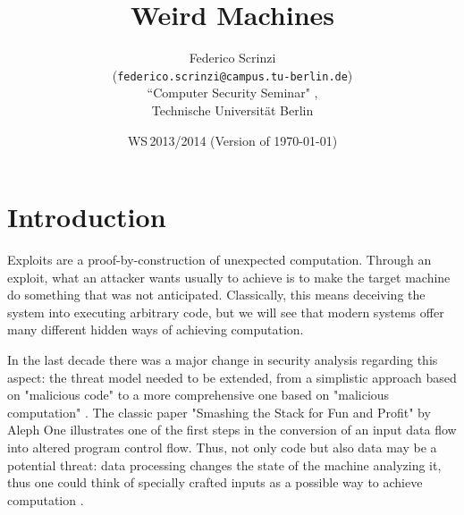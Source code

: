 \documentclass[11pt,twoside,a4paper]{article}
\begin{document}
\title{Weird Machines}
\author{Federico Scrinzi \\
  (\texttt{federico.scrinzi@campus.tu-berlin.de})\\[5mm]
  ``Computer Security Seminar" , \\
  Technische Universität Berlin
}
  
\date{WS\,2013/2014 (Version of \today)}

\maketitle



\section{Introduction}
Exploits are a proof-by-construction of unexpected computation. Through an exploit, what an attacker wants usually to achieve is to make the target machine do something that was not anticipated. Classically, this means deceiving the system into executing arbitrary code, but we will see that modern systems offer many different hidden ways of achieving computation.

In the last decade there was a major change in security analysis regarding this aspect: the threat model needed to be extended, from a simplistic approach based on "malicious code" to a more comprehensive one based on "malicious computation" \cite{hund}. 
The classic paper "Smashing the Stack for Fun and Profit" by Aleph One \cite{smashing} illustrates one of the first steps in the conversion of an input data flow into altered program control flow. Thus, not only code but also data may be a potential threat: data processing changes the state of the machine analyzing it, thus one could think of specially crafted inputs as a possible way to achieve computation \cite{noncontroldata}.
\end{document}
